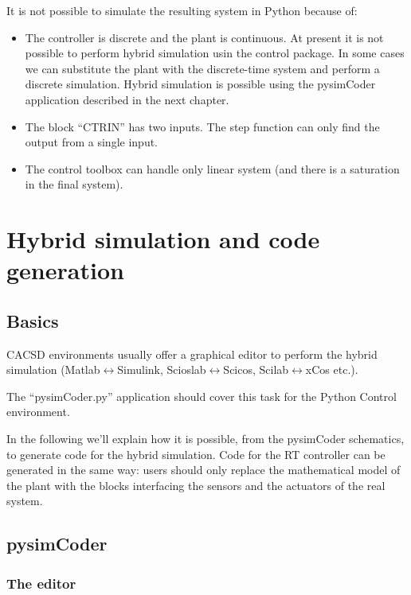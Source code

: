 It is not possible to simulate the resulting system in Python because of:

\begin{itemize}
\item The controller is discrete and the plant is continuous. At present it is 
not possible to perform hybrid simulation usin the control package. In some 
cases we can substitute the plant with the discrete-time system and perform a 
discrete 
simulation. Hybrid simulation is possible using the pysimCoder application 
described in the next chapter.
\item The block ``CTRIN'' has two inputs. The step function can only find the 
output from a single input.
\item The control toolbox can handle only linear system (and there is a 
saturation in the final system).
\end{itemize}

\chapter{Hybrid simulation and code generation}

\section{Basics}

CACSD environments usually offer a graphical 
editor to perform the hybrid simulation (Matlab$\leftrightarrow$Simulink, 
Scioslab$\leftrightarrow$Scicos, Scilab$\leftrightarrow$xCos etc.).

The ``pysimCoder.py'' application should cover this task for the Python Control 
environment.

In the following we'll explain how it is possible, from the pysimCoder schematics, 
to generate code for the hybrid simulation. Code for the RT controller can be 
generated in the same way: users should only replace the mathematical model 
of the plant with the blocks interfacing the sensors and the actuators of the 
real system.

\section{pysimCoder}

\subsection{The editor}

